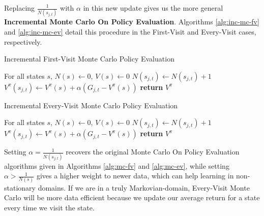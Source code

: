 \documentclass{article}
\begin{document}
Replacing $\frac{1}{N(s_{j,t})}$ with $\alpha$ in this new update gives us the more general \textbf{Incremental Monte Carlo On Policy Evaluation}.  Algorithms \ref{alg:inc-mc-fv} and \ref{alg:inc-mc-ev} detail this procedure in the First-Visit and Every-Visit cases, respectively.

\begin{algorithm}
\caption{Incremental First-Visit Monte Carlo Policy Evaluation}\label{alg:inc-mc-fv}
\begin{algorithmic}[1]
\State For all states $s$, $N(s)\gets 0$, $V(s)\gets 0$
\State $N(s_{j, t}) \gets N(s_{j, t}) + 1$
\State $V^\pi(s_{j, t}) \gets V^\pi(s) + \alpha (G_{j, t} - V^\pi(s))$
\EndIf
\EndFor
\EndFor
\State \textbf{return} $V^\pi$
\EndProcedure
\end{algorithmic}
\end{algorithm}

\begin{algorithm}
\caption{Incremental Every-Visit Monte Carlo Policy Evaluation}\label{alg:inc-mc-ev}
\begin{algorithmic}[1]
\State For all states $s$, $N(s)\gets 0$, $V(s)\gets 0$
\State $N(s_{j, t}) \gets N(s_{j, t}) + 1$
\State $V^\pi(s_{j, t}) \gets V^\pi(s) + \alpha (G_{j, t} - V^\pi(s))$
\EndFor
\EndFor
\State \textbf{return} $V^\pi$
\EndProcedure
\end{algorithmic}
\end{algorithm}

Setting $\alpha = \frac{1}{N(s_{j, t})}$ recovers the original Monte Carlo On Policy Evaluation algorithms given in Algorithms \ref{alg:mc-fv} and \ref{alg:mc-ev}, while setting $\alpha > \frac{1}{N(s)}$ gives a higher weight to newer data, which can help learning in non-stationary domains.  If we are in a truly Markovian-domain, Every-Visit Monte Carlo will be more data efficient because we update our average return for a state every time we visit the state.
\end{document}
